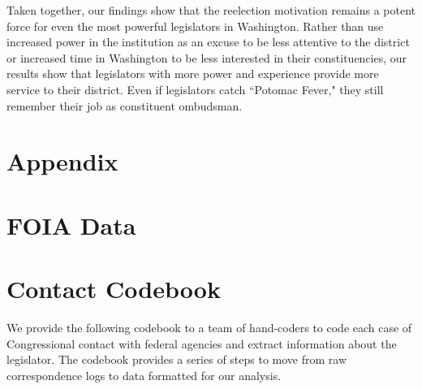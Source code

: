 \documentclass[12pt]{article}
\begin{document}
Taken together, our findings show that the reelection motivation remains a potent force for even the most powerful legislators in Washington. Rather than use increased power in the institution as an excuse to be less attentive to the district or increased time in Washington to be less interested in their constituencies, our results show that legislators with more power and experience provide more service to their district. Even if legislators catch ``Potomac Fever," they still remember their job as constituent ombudsman. 


\singlespacing




\clearpage
\appendix
\setcounter{table}{0}
\renewcommand{\thetable}{A\arabic{table}}

\section*{Appendix}

%

\section{FOIA Data}
%





\section{Contact Codebook} \label{a:codebook}
\singlespacing

We provide the following codebook to a team of hand-coders to code each case of Congressional contact with federal agencies and extract information about the legislator. The codebook provides a series of steps to move from raw correspondence logs to data formatted for our analysis.  
\end{document}
